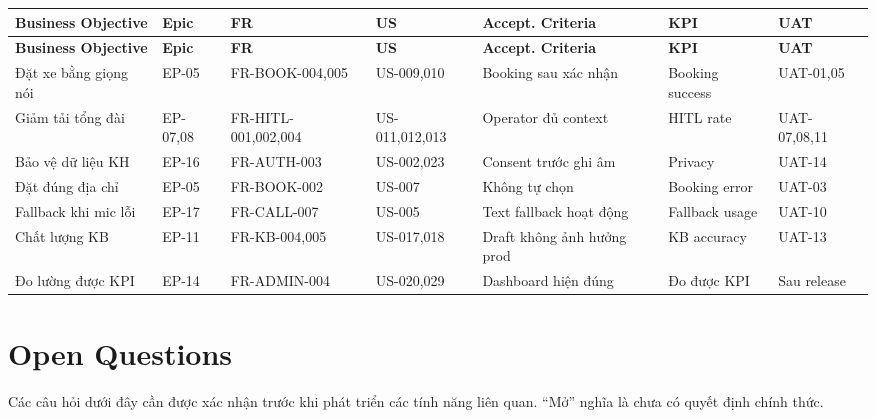 \documentclass[12pt,a4paper]{article}
\begin{document}
\small
\begin{longtable}{L{2.5cm} L{1.8cm} L{2cm} L{2cm} L{2.5cm} L{1.8cm} L{2cm}}
  \toprule
  \textbf{Business Objective}&\textbf{Epic}&\textbf{FR}&\textbf{US}&\textbf{Accept. Criteria}&\textbf{KPI}&\textbf{UAT}\\
  \midrule\endfirsthead\toprule{}\textbf{Business Objective}&\textbf{Epic}&\textbf{FR}&\textbf{US}&\textbf{Accept. Criteria}&\textbf{KPI}&\textbf{UAT}\\\midrule\endhead\bottomrule\endlastfoot
  Đặt xe bằng giọng nói & EP-05 & FR-BOOK-004,005 & US-009,010 & Booking sau xác nhận & Booking success & UAT-01,05 \\
  Giảm tải tổng đài & EP-07,08 & FR-HITL-001,002,004 & US-011,012,013 & Operator đủ context & HITL rate & UAT-07,08,11 \\
  Bảo vệ dữ liệu KH & EP-16 & FR-AUTH-003 & US-002,023 & Consent trước ghi âm & Privacy & UAT-14 \\
  Đặt đúng địa chỉ & EP-05 & FR-BOOK-002 & US-007 & Không tự chọn & Booking error & UAT-03 \\
  Fallback khi mic lỗi & EP-17 & FR-CALL-007 & US-005 & Text fallback hoạt động & Fallback usage & UAT-10 \\
  Chất lượng KB & EP-11 & FR-KB-004,005 & US-017,018 & Draft không ảnh hưởng prod & KB accuracy & UAT-13 \\
  Đo lường được KPI & EP-14 & FR-ADMIN-004 & US-020,029 & Dashboard hiện đúng & Đo được KPI & Sau release \\
\end{longtable}
\normalsize

\section{Open Questions}

\begin{tcolorbox}[decisionbox,title={Các câu hỏi cần xác nhận}]
  Các câu hỏi dưới đây cần được xác nhận trước khi phát triển các tính năng liên quan. ``Mở'' nghĩa là chưa có quyết định chính thức.
\end{tcolorbox}
\end{document}
